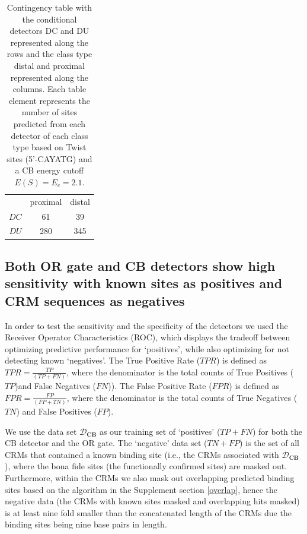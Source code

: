 \begin{table}[h!]
\centering
  \begin{tabular}{ r|c|c| }
\multicolumn{1}{r}{}
 &  \multicolumn{1}{c}{proximal}
 & \multicolumn{1}{c}{distal} \\
\cline{2-3}
$DC$ & 61 & 39 \\
\cline{2-3}
$DU$ &  280 & 345 \\
\cline{2-3}
\end{tabular}
\caption{Contingency table with the conditional detectors DC and DU represented along the rows and the class type distal and proximal represented along the columns. Each table element represents the number of sites predicted from each detector of each class type based on Twist sites (5'-CAYATG) and a CB energy cutoff $E(S)=E_c=2.1$.  %
 }\label{tabless2}
\end{table}



\subsection{Both OR gate and CB detectors show high sensitivity with known sites as positives and CRM sequences as negatives }
In order to test the sensitivity and the specificity of the detectors we used the Receiver Operator Characteristics (ROC), which displays the tradeoff between optimizing predictive performance for `positives', while also optimizing for not detecting known `negatives'.  The True Positive Rate ($TPR$) is defined as $TPR=\frac{TP}{(TP+FN)}$, where the denominator is the total counts of True Positives ($TP$)and False Negatives ($FN$)).  The False Positive Rate ($FPR$) is defined as $FPR=\frac{FP}{(FP+TN)}$, where the denominator is the total counts of True Negatives ($TN$) and False Positives ($FP$).

We use the data set $\mathcal D_{\textbf{CB}}$ as our training set of `positives' ($TP+FN$) for both the CB detector and the OR gate.  The `negative' data set ($TN+FP$) is the set of all CRMs that contained a known binding site (i.e., the CRMs associated with $\mathcal D_{\textbf{CB}}$), where the bona fide sites (the functionally confirmed sites) are masked out.  Furthermore, within the CRMs we also mask out overlapping predicted binding sites based on the algorithm in the Supplement section \ref{overlap}, hence the negative data (the CRMs with known sites masked and overlapping hits masked) is at least nine fold smaller than the concatenated length of the CRMs due the binding sites being nine base pairs in length. 

